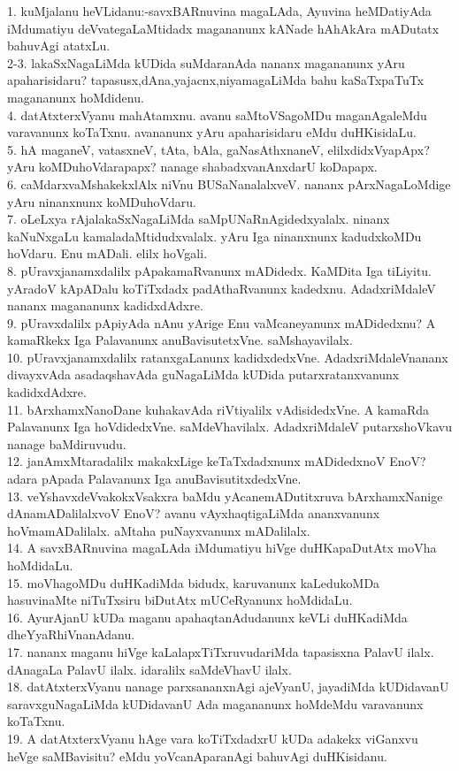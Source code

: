 \documentclass{article}
\begin{document}
1. kuMjalanu heVLidanu:-savxBARnuvina magaLAda, Ayuvina heMDatiyAda iMdumatiyu deVvategaLaMtidadx magananunx kANade hAhAkAra mADutatx bahuvAgi atatxLu.\\
2-3. lakaSxNagaLiMda kUDida suMdaranAda nananx magananunx yAru apaharisidaru? tapasusx,dAna,yajacnx,niyamagaLiMda bahu kaSaTxpaTuTx magananunx hoMdidenu.\\
4. datAtxterxVyanu mahAtamxnu. avanu saMtoVSagoMDu maganAgaleMdu varavanunx koTaTxnu. avananunx yAru apaharisidaru eMdu duHKisidaLu.\\
5. hA maganeV, vatasxneV, tAta, bAla, gaNasAthxnaneV, elilxdidxVyapApx? yAru koMDuhoVdarapapx? nanage shabadxvanAnxdarU koDapapx.\\
6. caMdarxvaMshakekxlAlx niVnu BUSaNanalalxveV. nananx pArxNagaLoMdige yAru ninanxnunx koMDuhoVdaru.\\
7. oLeLxya rAjalakaSxNagaLiMda saMpUNaRnAgidedxyalalx. ninanx kaNuNxgaLu kamaladaMtidudxvalalx. yAru Iga ninanxnunx kadudxkoMDu hoVdaru. Enu mADali. elilx hoVgali.\\
8. pUravxjanamxdalilx pApakamaRvanunx mADidedx. KaMDita Iga tiLiyitu. yAradoV kApADalu koTiTxdadx padAthaRvanunx kadedxnu. AdadxriMdaleV nananx magananunx kadidxdAdxre.\\
9. pUravxdalilx pApiyAda nAnu yArige Enu vaMcaneyanunx mADidedxnu? A kamaRkekx Iga Palavanunx anuBavisutetxVne. saMshayavilalx.\\
10. pUravxjanamxdalilx ratanxgaLanunx kadidxdedxVne. AdadxriMdaleVnananx divayxvAda asadaqshavAda guNagaLiMda kUDida putarxratanxvanunx kadidxdAdxre.\\
11. bArxhamxNanoDane kuhakavAda riVtiyalilx vAdisidedxVne. A kamaRda Palavanunx Iga hoVdidedxVne. saMdeVhavilalx. AdadxriMdaleV putarxshoVkavu nanage baMdiruvudu.\\
12. janAmxMtaradalilx makakxLige keTaTxdadxnunx mADidedxnoV EnoV? adara pApada Palavanunx Iga anuBavisutitxdedxVne.\\
13. veYshavxdeVvakokxVsakxra baMdu yAcanemADutitxruva bArxhamxNanige dAnamADalilalxvoV EnoV? avanu vAyxhaqtigaLiMda ananxvanunx hoVmamADalilalx. aMtaha puNayxvanunx mADalilalx.\\
14. A savxBARnuvina magaLAda iMdumatiyu hiVge duHKapaDutAtx moVha hoMdidaLu.\\
15. moVhagoMDu duHKadiMda bidudx, karuvanunx kaLedukoMDa hasuvinaMte niTuTxsiru biDutAtx mUCeRyanunx hoMdidaLu.\\
16. AyurAjanU kUDa maganu apahaqtanAdudanunx keVLi duHKadiMda dheYyaRhiVnanAdanu.\\
17. nananx maganu hiVge kaLalapxTiTxruvudariMda tapasisxna PalavU ilalx. dAnagaLa PalavU ilalx. idaralilx saMdeVhavU ilalx.\\
18. datAtxterxVyanu nanage parxsananxnAgi ajeVyanU, jayadiMda kUDidavanU saravxguNagaLiMda kUDidavanU Ada magananunx hoMdeMdu varavanunx koTaTxnu.\\
19. A datAtxterxVyanu hAge vara koTiTxdadxrU kUDa adakekx viGanxvu heVge saMBavisitu? eMdu yoVcanAparanAgi bahuvAgi duHKisidanu.
\end{document}
